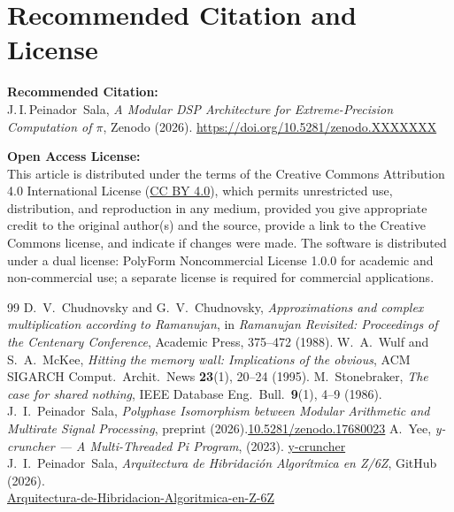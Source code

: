 \documentclass[12pt,a4paper]{article}
\theoremstyle{plain}
\theoremstyle{definition}
\theoremstyle{remark}
\begin{document}
\section*{Recommended Citation and License}

\noindent\textbf{Recommended Citation:} \\
J.\,I.\,Peinador~Sala, \emph{A Modular DSP Architecture for Extreme-Precision Computation of \(\pi\)}, Zenodo (2026). \url{https://doi.org/10.5281/zenodo.XXXXXXX}

\vspace{1em}
\noindent\textbf{Open Access License:} \\
This article is distributed under the terms of the Creative Commons Attribution 4.0 International License (\href{https://creativecommons.org/licenses/by/4.0/}{CC BY 4.0}), which permits unrestricted use, distribution, and reproduction in any medium, provided you give appropriate credit to the original author(s) and the source, provide a link to the Creative Commons license, and indicate if changes were made.
The software is distributed under a dual license: PolyForm Noncommercial License 1.0.0 for academic and non-commercial use; a separate license is required for commercial applications.


\begin{thebibliography}{99}
 D.~V.~Chudnovsky and G.~V.~Chudnovsky, \emph{Approximations and complex multiplication according to Ramanujan}, in \emph{Ramanujan Revisited: Proceedings of the Centenary Conference}, Academic Press, 375--472 (1988).
 W.~A.~Wulf and S.~A.~McKee, \emph{Hitting the memory wall: Implications of the obvious}, ACM SIGARCH Comput.\ Archit.\ News \textbf{23}(1), 20--24 (1995).
 M.~Stonebraker, \emph{The case for shared nothing}, IEEE Database Eng.\ Bull.\ \textbf{9}(1), 4--9 (1986).
 J.~I.~Peinador~Sala, \emph{Polyphase Isomorphism between Modular Arithmetic and Multirate Signal Processing}, preprint (2026).\href{https://doi.org/10.5281/zenodo.17680023}{10.5281/zenodo.17680023}
 A.~Yee, \emph{y-cruncher --- A Multi-Threaded Pi Program},  (2023). \href{http://www.numberworld.org/y-cruncher/}{y-cruncher}
 J.~I.~Peinador~Sala, \emph{Arquitectura de Hibridación Algorítmica en Z/6Z}, GitHub (2026). \\ \href{https://github.com/NachoPeinador/Arquitectura-de-Hibridacion-Algoritmica-en-Z-6Z}{Arquitectura-de-Hibridacion-Algoritmica-en-Z-6Z} 
\end{thebibliography}
\end{document}
